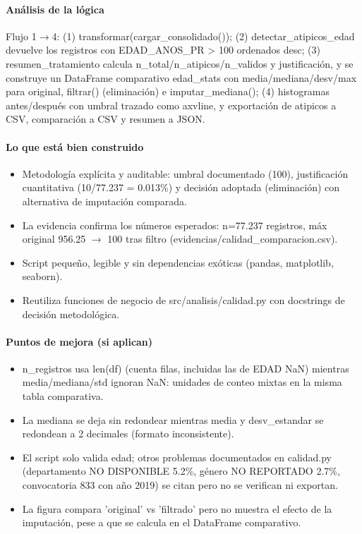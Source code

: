 \paragraph{Análisis de la lógica}
Flujo 1$\rightarrow$4: (1) transformar(cargar\_consolidado()); (2) detectar\_atipicos\_edad devuelve los registros con EDAD\_ANOS\_PR > 100 ordenados desc; (3) resumen\_tratamiento calcula n\_total/n\_atipicos/n\_validos y justificación, y se construye un DataFrame comparativo edad\_stats con media/mediana/desv/max para original, filtrar() (eliminación) e imputar\_mediana(); (4) histogramas antes/después con umbral trazado como axvline, y exportación de atipicos a CSV, comparación a CSV y resumen a JSON.

\paragraph{Lo que está bien construido}
\begin{itemize}
  \item Metodología explícita y auditable: umbral documentado (100), justificación cuantitativa (10/77.237 = 0.013\%) y decisión adoptada (eliminación) con alternativa de imputación comparada.
  \item La evidencia confirma los números esperados: n=77.237 registros, máx original 956.25 $\rightarrow$ 100 tras filtro (evidencias/calidad\_comparacion.csv).
  \item Script pequeño, legible y sin dependencias exóticas (pandas, matplotlib, seaborn).
  \item Reutiliza funciones de negocio de src/analisis/calidad.py con docstrings de decisión metodológica.
\end{itemize}

\paragraph{Puntos de mejora (si aplican)}
\begin{itemize}
  \item n\_registros usa len(df) (cuenta filas, incluidas las de EDAD NaN) mientras media/mediana/std ignoran NaN: unidades de conteo mixtas en la misma tabla comparativa.
  \item La mediana se deja sin redondear mientras media y desv\_estandar se redondean a 2 decimales (formato inconsistente).
  \item El script solo valida edad; otros problemas documentados en calidad.py (departamento NO DISPONIBLE 5.2\%, género NO REPORTADO 2.7\%, convocatoria 833 con año 2019) se citan pero no se verifican ni exportan.
  \item La figura compara 'original' vs 'filtrado' pero no muestra el efecto de la imputación, pese a que se calcula en el DataFrame comparativo.
\end{itemize}

